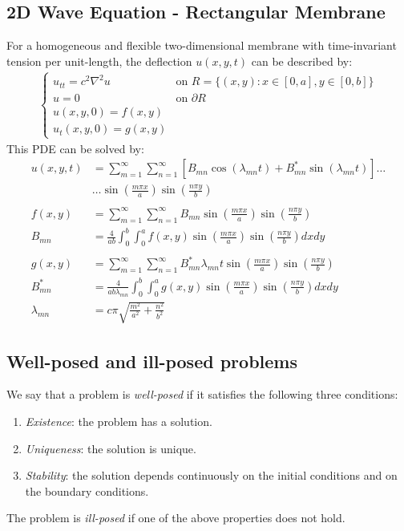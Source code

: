 \subsection{2D Wave Equation - Rectangular Membrane}\label{ssec:2d_wave_rect}
For a homogeneous and flexible two-dimensional membrane with time-invariant tension per unit-length,
the deflection $u(x,y,t)$ can be described by:
\begin{align*}
    \begin{cases}
        u_{tt}=c^2\nabla^2u & \text{on }R=\{(x,y):x\in[0,a],y\in[0,b]\} \\
        u=0                 & \text{on }\partial R                      \\
        u(x,y,0)=f(x,y)                                                 \\
        u_t(x,y,0)=g(x,y)
    \end{cases}
\end{align*}
This PDE can be solved by:
\begin{align*}
    u(x,y,t)     & =\sum_{m=1}^{\infty}\sum_{n=1}^{\infty}\left[B_{mn}\cos(\lambda_{mn}t)+B_{mn}^{*}\sin(\lambda_{mn}t)\right]\dots
    \\&\dots \sin\left(\frac{m\pi x}{a}\right)\sin\left(\frac{n\pi y}{b}\right)\\\\
    f(x,y)       & =\sum_{m=1}^{\infty}\sum_{n=1}^{\infty}B_{mn}\sin\left(\frac{m\pi x}a\right)\sin\left(\frac{n\pi y}b\right)             \\
    B_{mn}       & = \frac4{ab}\int_0^b\int_0^{a}f(x,y)\sin\left(\frac{m\pi x}a\right)\sin\left(\frac{n\pi y}b\right)dxdy                  \\\\
    g(x,y)       & =\sum_{m=1}^\infty\sum_{n=1}^\infty B_{mn}^*\lambda_{mn}t\sin\left(\frac{m\pi x}a\right)\sin\left(\frac{n\pi y}b\right) \\
    B_{mn}^{*}   & =\frac4{ab\lambda_{mn}}\int_{0}^{b}\int_{0}^{a}g(x,y)\sin\left(\frac{m\pi x}a\right)\sin\left(\frac{n\pi y}b\right)dxdy \\
    \lambda_{mn} & = c\pi\sqrt{\frac{m^2}{a^2}+\frac{n^2}{b^2}}
\end{align*}

\subsection{Well-posed and ill-posed problems}
We say that a problem is \textit{well-posed} if it satisfies the following three conditions:
\begin{enumerate}
    \item \textit{Existence}: the problem has a solution.
    \item \textit{Uniqueness}: the solution is unique.
    \item \textit{Stability}: the solution depends continuously on the initial conditions and on the boundary conditions.
\end{enumerate}
The problem is \textit{ill-posed} if one of the above properties does not hold.


